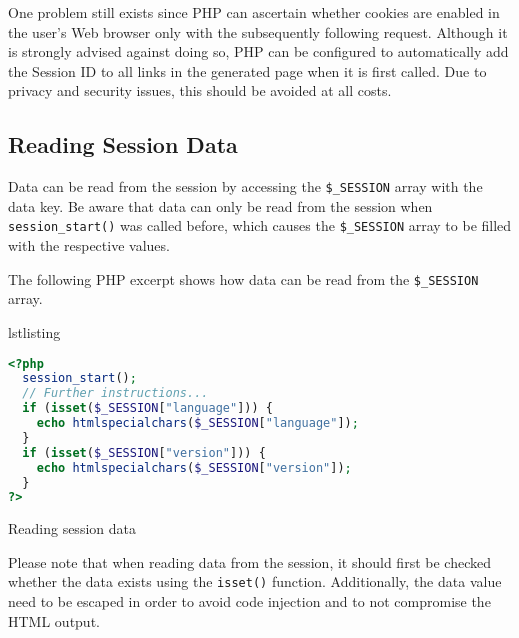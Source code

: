 \documentclass[a4paper, justified, notoc]{tufte-handout} %
\makeatletter
\newenvironment{listing}[1][htbp]
  {\ifvmode\else\unskip\fi\begin{@tufte@float}[#1]{lstlisting}{}}
  {\end{@tufte@float} } %
\makeatother
\begin{document}
One problem still exists since PHP can ascertain whether cookies are enabled in the user's Web browser only with the subsequently following request. Although it is strongly advised against doing so, PHP can be configured to automatically add the Session ID to all links in the generated page when it is first called. Due to privacy and security issues, this should be avoided at all costs.


\subsection{Reading Session Data} %
\label{sub:reading_session_data}
Data can be read from the session by accessing the \texttt{\$\_SESSION} array with the data key.
Be aware that data can only be read from the session when \texttt{session\_start()} was called before, which causes the \texttt{\$\_SESSION} array to be filled with the respective values. 

The following PHP excerpt shows how data can be read from the \texttt{\$\_SESSION} array. 
\begin{listing}
\begin{lstlisting}[language=PHP]
<?php
  session_start();
  // Further instructions...
  if (isset($_SESSION["language"])) {
    echo htmlspecialchars($_SESSION["language"]);
  }
  if (isset($_SESSION["version"])) {
    echo htmlspecialchars($_SESSION["version"]);
  }
?>
\end{lstlisting}
	\caption{Reading session data}
	\label{reading_session_data}
\end{listing}

Please note that when reading data from the session, it should first be checked whether the data exists using the \texttt{isset()} function. Additionally, the data value need to be escaped in order to avoid code injection and to not compromise the HTML output. 
\end{document}
